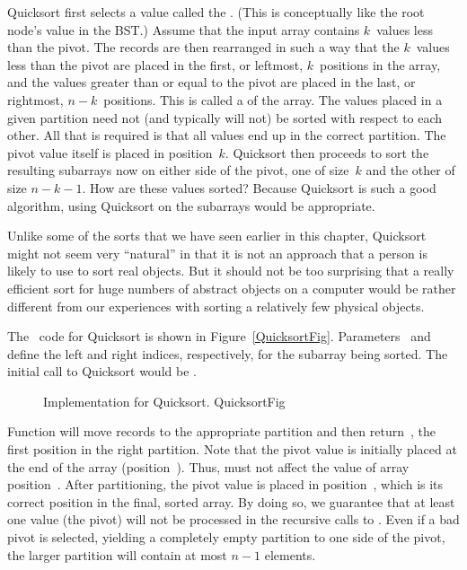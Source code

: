 Quicksort first selects a value called the .
(This is conceptually like the root node's value in the BST.)
Assume that the input array contains \(k\)~values less than the pivot.
The records are then rearranged in such a way that the \(k\)~values less
than the pivot are placed in the first, or leftmost, \(k\)~positions
in the array, and the values greater than or equal to
the pivot are placed in the last, or rightmost, \(n-k\)~positions.
This is called a  of the array.
The values placed in a given partition need not (and typically will
not) be sorted with respect to each other.
All that is required is that all values end up in the correct
partition.
The pivot value itself is placed in position~\(k\).
Quicksort then proceeds to sort the resulting subarrays now on either
side of the pivot, one of size~\(k\) and the other of size \(n-k-1\).
How are these values sorted?
Because Quicksort is such a good algorithm, using Quicksort on
the subarrays would be appropriate.

Unlike some of the sorts that we have seen earlier in this chapter,
Quicksort might not seem very ``natural'' in that it is not an
approach that a person is likely to use to sort real objects.
But it should not be too surprising that a really efficient sort for
huge numbers of abstract objects on a computer would be rather
different from our experiences with sorting a relatively few physical
objects.

The \Lang\ code for Quicksort is shown in Figure~\ref{QuicksortFig}.
Parameters~ and~ define the left and right indices,
respectively, for the subarray being sorted.
The initial call to Quicksort would be .

\begin{figure}

\vspace{-\bigskipamount}
{Implementation for Quicksort.}
{QuicksortFig}
\end{figure}

Function  will move records to the appropriate
partition and then return~, the first position in the
right partition.
Note that the pivot value is initially placed at the end of the array
(position~).
Thus,  must not affect the value of array
position~.
After partitioning, the pivot value is placed in position~,
which is its correct position in the final, sorted array.
By doing so, we guarantee that at least one value (the pivot) will not
be processed in the recursive calls to .
Even if a bad pivot is selected, yielding a completely empty
partition to one side of the pivot, the larger partition will contain
at most \(n-1\) elements.

